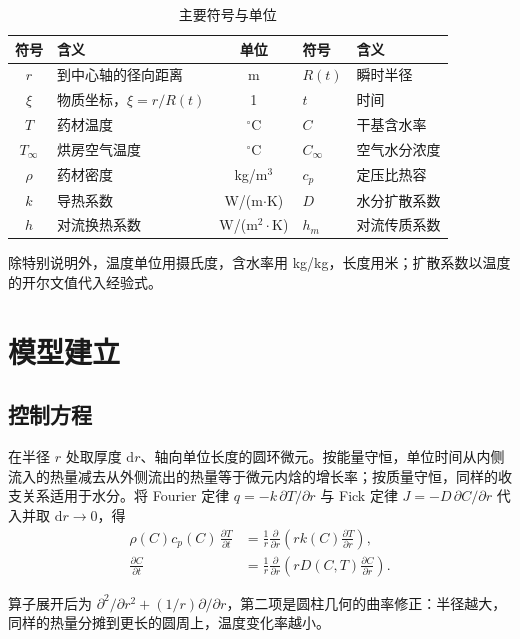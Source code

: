 \documentclass[12pt,a4paper]{ctexart}
\begin{document}
\begin{table}[htbp]
\centering
\caption{主要符号与单位}
\label{tab:sym}
\begin{tabular}{clcll}
\toprule
符号 & 含义 & 单位 & 符号 & 含义 \\
\midrule
$r$ & 到中心轴的径向距离 & m & $R(t)$ & 瞬时半径 \\
$\xi$ & 物质坐标，$\xi=r/R(t)$ & 1 & $t$ & 时间 \\
$T$ & 药材温度 & $^\circ$C & $C$ & 干基含水率 \\
$T_\infty$ & 烘房空气温度 & $^\circ$C & $C_\infty$ & 空气水分浓度 \\
$\rho$ & 药材密度 & kg/m$^3$ & $c_p$ & 定压比热容 \\
$k$ & 导热系数 & W/(m$\cdot$K) & $D$ & 水分扩散系数 \\
$h$ & 对流换热系数 & W/(m$^2\cdot$K) & $h_m$ & 对流传质系数 \\
\bottomrule
\end{tabular}
\end{table}

除特别说明外，温度单位用摄氏度，含水率用 kg/kg，长度用米；扩散系数以温度的开尔文值代入经验式。

\section{模型建立}

\subsection{控制方程}

在半径 $r$ 处取厚度 $\mathrm{d}r$、轴向单位长度的圆环微元。按能量守恒，单位时间从内侧流入的热量减去从外侧流出的热量等于微元内焓的增长率；按质量守恒，同样的收支关系适用于水分。将 Fourier 定律 $q=-k\,\partial T/\partial r$ 与 Fick 定律 $J=-D\,\partial C/\partial r$ 代入并取 $\mathrm{d}r\to0$，得
\begin{align}
\rho(C)c_p(C)\,\frac{\partial T}{\partial t}
  &= \frac{1}{r}\frac{\partial}{\partial r}\!\left(rk(C)\frac{\partial T}{\partial r}\right), \\
\frac{\partial C}{\partial t}
  &= \frac{1}{r}\frac{\partial}{\partial r}\!\left(rD(C,T)\frac{\partial C}{\partial r}\right).
\end{align}

算子展开后为 $\partial^2/\partial r^2+(1/r)\partial/\partial r$，第二项是圆柱几何的曲率修正：半径越大，同样的热量分摊到更长的圆周上，温度变化率越小。
\end{document}
